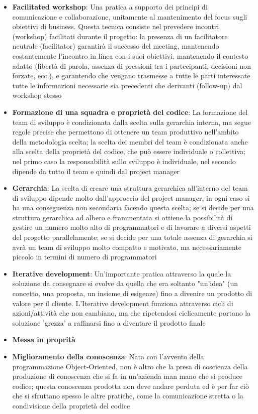\documentclass[11pt,a4paper]{book}
\begin{document}
\begin{itemize}
	\item \textbf{Facilitated workshop}: Una pratica a supporto dei principi di comunicazione e collaborazione, unitamente al mantenimento del focus sugli obiettivi di business. Questa tecnica consiste nel prevedere incontri (workshop) facilitati durante il progetto: la presenza di un facilitatore neutrale (facilitator) garantirà il successo del meeting, mantenendo costantemente l'incontro in linea con i suoi obiettivi, mantenendo il contesto adatto (libertà di parola, assenza di pressioni tra i partecipanti, decisioni non forzate, ecc.), e garantendo che vengano trasmesse a tutte le parti interessate tutte le informazioni necessarie sia precedenti che derivanti (follow-up) dal workshop stesso
	\item \textbf{Formazione di una squadra e proprietà del codice}: La formazione del team di sviluppo è condizionata dalla scelta sulla gerarchia interna, ma segue regole precise che permettono di ottenere un team produttivo nell'ambito della metodologia scelta; la scelta dei membri del team è condizionata anche alla scelta della proprietà del codice, che può essere individuale o collettiva; nel primo caso la responsabilità sullo sviluppo è individuale, nel secondo dipende da tutto il team e quindi dal project manager
	\item \textbf{Gerarchia}: La scelta di creare una struttura gerarchica all'interno del team di sviluppo dipende molto dall'approccio del project manager, in ogni caso si ha una conseguenza non secondaria facendo questa scelta; se si decide per una struttura gerarchica ad albero e frammentata si ottiene la possibilità di gestire un numero molto alto di programmatori e di lavorare a diversi aspetti del progetto parallelamente; se si decide per una totale assenza di gerarchia si avrà un team di sviluppo molto compatto e motivato, ma necessariamente piccolo in termini di numero di programmatori
	\item \textbf{Iterative development}: Un'importante pratica attraverso la quale la soluzione da consegnare si evolve da quella che era soltanto "un'idea" (un concetto, una proposta, un insieme di esigenze) fino a divenire un prodotto di valore per il cliente. L'Iterative development funziona attraverso cicli di azioni/attività che non cambiano, ma che ripetendosi ciclicamente portano la soluzione 'grezza' a raffinarsi fino a diventare il prodotto finale	
	\item \textbf{Messa in proprità}
	\item \textbf{Miglioramento della conoscenza}: Nata con l'avvento della programmazione Object-Oriented, non è altro che la presa di coscienza della produzione di conoscenza che si fa in un'azienda man mano che si produce codice; questa conoscenza prodotta non deve andare perduta ed è per far ciò che si sfruttano spesso le altre pratiche, come la comunicazione stretta o la condivisione della proprietà del codice

\end{itemize}
\end{document}
